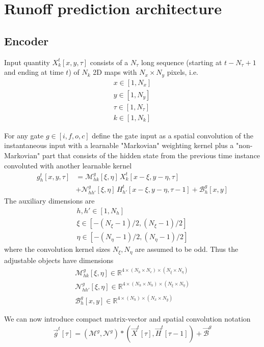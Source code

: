 \documentclass[10pt,a4paper]{article}
\author{Sven Karsten}
\begin{document}
\section{Runoff prediction architecture}

\subsection{Encoder}

Input quantity $ X^t_k[x, y, \tau]$ consists of a $N_\tau$ long sequence (starting at $t-N_\tau+1$ and ending at time $t$)  of $N_k$ 2D maps with $N_x \times N_y$ pixels, i.e.
\begin{align}
x \in [1,N_x] \\
y \in [1,N_y] \\
\tau \in [1,N_\tau] \\
k \in [1,N_k]
\end{align}

For any gate $g \in [i, f, o, c] $ define the gate input as a spatial convolution of the instantaneous input with a learnable "Markovian" weighting kernel plus a "non-Markovian" part that consists of the hidden state from the previous time instance convoluted with another learnable kernel  
\begin{align}
g^t_h[x,y,\tau] & =  \mathcal{M}^{g}_{hk} [\xi,\eta]\, X^t_k[x-\xi, y-\eta, \tau] \\
& +  \mathcal{N}^{g}_{hh'}[\xi,\eta] \, H^t_{h'}[x-\xi, y-\eta, \tau-1] + \mathcal{B}^g_{h}[x,y]
\end{align}
%
The auxiliary dimensions are
\begin{align}
h,h' \in [1,N_h] \\
\xi\in [-(N_\xi-1)/2,(N_\xi-1)/2]\\
\eta\in [-(N_\eta-1)/2,(N_\eta-1)/2]
\end{align}
%
where the convolution kernel sizes $N_\xi, N_\eta$ are assumed to be odd.
%
Thus the adjustable objects have dimensions
\begin{align}
\mathcal{M}^{g}_{hk}[\xi,\eta] \in \mathbb{R}^{4\times(N_h\times N_c) \times(N_\xi \times N_\eta)} \\
\mathcal{N}^{g}_{hh'}[\xi,\eta] \in \mathbb{R}^{4\times(N_h\times N_h) \times (N_\xi \times N_\eta)} \\
\mathcal{B}^g_{h}[x,y] \in \mathbb{R}^{4 \times(N_h) \times (N_x\times N_y) }
\end{align}

%
We can now introduce compact matrix-vector and spatial convolution notation
\begin{align}
\vec{g}^t[\tau] = \left(\pmb{\mathcal{M}}^{g}, \pmb{\mathcal{N}}^{g}\right) \ast \left(\vec{X}^t[\tau], \vec{H}^t[ \tau-1]\right)+ \vec{\mathcal{B}}^g
\end{align}
\end{document}
